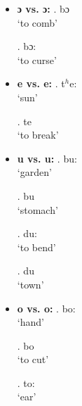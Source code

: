 \documentclass{assets/fieldnotes}
\begin{document}
\begin{itemize}
    \item \textbf{ɔ vs. ɔ:}
    \ex. bɔ\\
        `to comb'

    \ex. bɔ:\\
        `to curse'
    
    \item \textbf{e vs. e:}
    \ex. t$^h$e:\\
        `sun'

    \ex. te\\
        `to break'

    \item \textbf{u vs. u:}
    \ex. bu:\\
        `garden'

    \ex. bu\\
        `stomach'
    
    \ex. du:\\
        `to bend'

    \ex. du\\
        `town'

    \item \textbf{o vs. o:}
    \ex. bo:\\
        `hand'
        
    \ex. bo\\
        `to cut'
        
    \ex. to:\\
        `ear'

\end{itemize}
\end{document}
